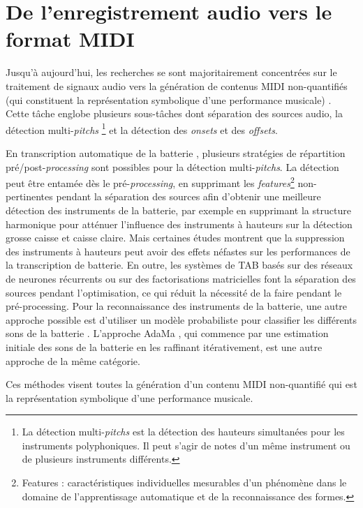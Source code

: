 \section{De l’enregistrement audio vers le format MIDI}
\label{audio_to_midi}
Jusqu’à aujourd’hui, les recherches se sont majoritairement concentrées sur le
traitement de signaux audio vers la génération de contenus MIDI non-quantifiés
(qui constituent la représentation symbolique d’une performance musicale)
\cite{AMT_for_2_Instru}. Cette tâche englobe plusieurs sous-tâches dont
séparation des sources audio, la détection multi-\textit{pitchs} \footnote{
    La détection multi-\textit{pitchs} est la
détection des hauteurs simultanées pour les instruments polyphoniques. Il peut
s’agir de notes d’un même instrument ou de plusieurs instruments différents.}
et la détection des \textit{onsets} et des \textit{offsets}.


En transcription automatique de la batterie \cite{Review_ADT}, plusieurs
stratégies de répartition pré/post-\textit{processing} sont possibles pour la
détection multi-\textit{pitchs}. La détection peut être entamée dès le
pré-\textit{processing}, en supprimant les \textit{features}\footnote{
Features : caractéristiques individuelles mesurables d'un phénomène dans le
domaine de l'apprentissage automatique et de la reconnaissance des formes.}
non-pertinentes pendant la séparation des sources afin d’obtenir une meilleure
détection des instruments de la batterie, par exemple en supprimant la
structure harmonique pour atténuer l’influence des instruments à hauteurs sur
la détection grosse caisse et caisse claire. Mais certaines études montrent que
la suppression des instruments à hauteurs peut avoir des effets néfastes sur
les performances de la transcription de batterie. En outre, les systèmes de TAB
basés sur des réseaux de neurones récurrents ou sur des factorisations
matricielles font la séparation des sources pendant l’optimisation, ce qui
réduit la nécessité de la faire pendant le pré-processing. Pour la
reconnaissance des instruments de la batterie, une autre approche possible est
d’utiliser un modèle probabiliste pour classifier les différents sons de la
batterie \cite{Eronen}. L’approche AdaMa \cite{adama_1}, qui commence par une
estimation initiale des sons de la batterie en les raffinant itérativement, est
une autre approche de la même catégorie.

Ces méthodes visent toutes la génération d’un contenu MIDI non-quantifié qui
est la représentation symbolique d’une performance musicale.

